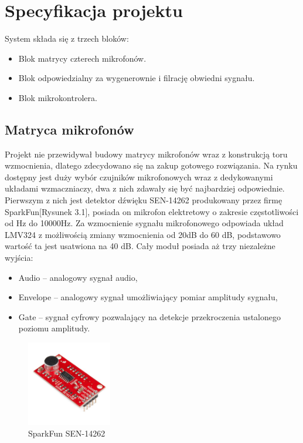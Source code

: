 \documentclass[eng,printmode]{mgr}
\begin{document}
\chapter{Specyfikacja projektu}
System składa się z trzech bloków:
\begin{itemize}
\item Blok matrycy czterech mikrofonów.
\item Blok odpowiedzialny za wygenerownie i filrację obwiedni sygnału. 
\item Blok mikrokontrolera.
\end{itemize}
\section{Matryca mikrofonów}
Projekt nie przewidywał budowy matrycy mikrofonów wraz z konstrukcją toru wzmocnienia, dlatego zdecydowano się na zakup gotowego rozwiązania. Na rynku dostępny jest duży wybór czujników mikrofonowych wraz z dedykowanymi układami wzmaczniaczy, dwa z nich zdawały się być najbardziej odpowiednie.\\
Pierwszym z nich jest detektor dźwięku SEN-14262 produkowany przez firmę SparkFun[Rysunek 3.1], posiada on mikrofon elektretowy o zakresie częstotliwości od \unit[100]{Hz} do 10000Hz. Za wzmocnienie sygnału mikrofonowego odpowiada układ LMV324 z możliwością zmiany wzmocnienia od 20dB do 60 dB, podstawowo wartość ta jest usatwiona na 40 dB. Cały moduł posiada aż trzy niezależne wyjścia:
\begin{itemize}
\item Audio -- analogowy sygnał audio,
\item Envelope -- analogowy sygnał umożliwiający pomiar amplitudy sygnału,
\item Gate -- sygnał cyfrowy pozwalający na detekcje przekroczenia ustalonego poziomu amplitudy.
\end{itemize}

\begin{figure}

    \centering

  \includegraphics[width=0.33\textwidth, angle=0]{detektor1.jpg}

    \caption{SparkFun SEN-14262}

    

\end{figure}
\end{document}
